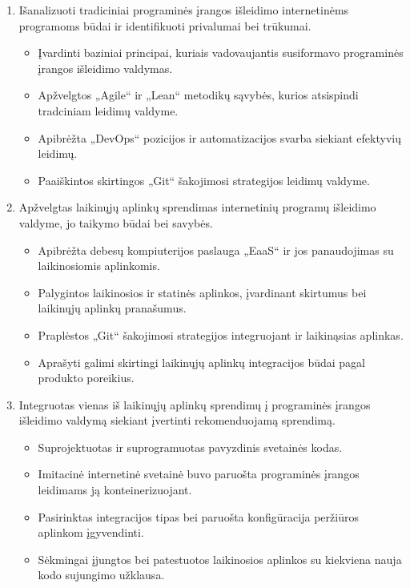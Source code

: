 \documentclass{VUMIFPSkursinis}
\begin{document}
\begin{enumerate}
  \item Išanalizuoti tradiciniai programinės įrangos išleidimo internetinėms programoms būdai ir identifikuoti privalumai bei trūkumai.
    \begin{itemize}
      \item Įvardinti baziniai principai, kuriais vadovaujantis susiformavo programinės įrangos išleidimo valdymas.
      \item Apžvelgtos „Agile“ ir „Lean“ metodikų sąvybės, kurios atsispindi tradciniam leidimų valdyme.
      \item Apibrėžta „DevOps“ pozicijos ir automatizacijos svarba siekiant efektyvių leidimų.
      \item Paaiškintos skirtingos „Git“ šakojimosi strategijos leidimų valdyme.
    \end{itemize}
  \item Apžvelgtas laikinųjų aplinkų sprendimas internetinių programų išleidimo valdyme, jo taikymo būdai bei savybės.
    \begin{itemize}
      \item Apibrėžta debesų kompiuterijos paslauga „EaaS“ ir jos panaudojimas su laikinosiomis aplinkomis.
      \item Palygintos laikinosios ir statinės aplinkos, įvardinant skirtumus bei laikinųjų aplinkų pranašumus.
      \item Praplėstos „Git“ šakojimosi strategijos integruojant ir laikinąsias aplinkas.
      \item Aprašyti galimi skirtingi laikinųjų aplinkų integracijos būdai pagal produkto poreikius.
    \end{itemize}
  \item Integruotas vienas iš laikinųjų aplinkų sprendimų į programinės įrangos išleidimo valdymą siekiant įvertinti rekomenduojamą sprendimą.
    \begin{itemize}
      \item Suprojektuotas ir suprogramuotas pavyzdinis svetainės kodas.
      \item Imitacinė internetinė svetainė buvo paruošta programinės įrangos leidimams ją konteinerizuojant. 
      \item Pasirinktas integracijos tipas bei paruošta konfigūracija peržiūros aplinkom įgyvendinti.
      \item Sėkmingai įjungtos bei patestuotos laikinosios aplinkos su kiekviena nauja kodo sujungimo užklausa.
    \end{itemize}
\end{enumerate}
\end{document}
